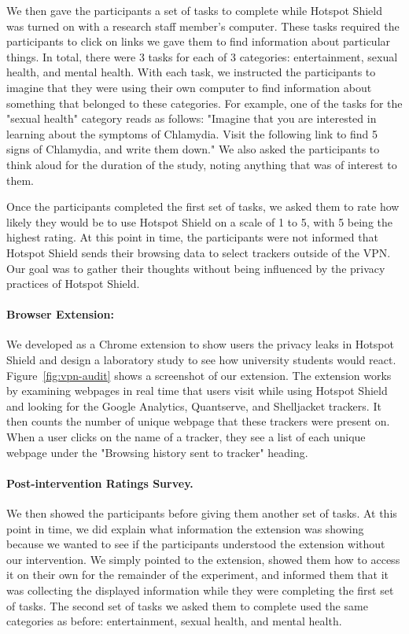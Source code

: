 We then gave the participants a set of tasks to complete while Hotspot Shield
was turned on with a research staff member's computer.  These tasks required
the participants to click on links we gave them to find information about
particular things.  In total, there were 3 tasks for each of 3 categories:
entertainment, sexual health, and mental health.  With each task, we
instructed the participants to imagine that they were using their own computer
to find information about something that belonged to these categories.  For
example, one of the tasks for the "sexual health" category reads as follows:
"Imagine that you are interested in learning about the symptoms of Chlamydia.
Visit the following link to find 5 signs of Chlamydia, and write them down."
We also asked the participants to think aloud for the duration of the study,
noting anything that was of interest to them.  

Once the participants completed the first set of tasks, we asked them to rate
how likely they would be to use Hotspot Shield on a scale of 1 to 5, with 5
being the highest rating.  At this point in time, the participants were not
informed that Hotspot Shield sends their browsing data to select trackers
outside of the VPN.  Our goal was to gather their thoughts without being
influenced by the privacy practices of Hotspot Shield.

\paragraph{Browser Extension: \tool}
We developed \tool as a Chrome extension to show users the privacy leaks
in Hotspot Shield and design a laboratory study to see how university students
would react.  Figure~\ref{fig:vpn-audit} shows a screenshot of our extension.
The extension works by examining webpages in real time that users visit while
using Hotspot Shield and looking for the Google Analytics, Quantserve, and
Shelljacket trackers.  It then counts the number of unique webpage that these
trackers were present on.  When a user clicks on the name of a tracker, they
see a list of each unique webpage under the "Browsing history sent to tracker"
heading. 


\paragraph{Post-intervention Ratings Survey.}
We then showed the participants \tool before giving them another set of tasks.
At this point in time, we did explain what information the extension was showing because we wanted to see if the participants understood the extension without our intervention.
We simply pointed to the extension, showed them how to access it on their own for the remainder of the experiment, and informed them that it was collecting the displayed information while they were completing the first set of tasks.
The second set of tasks we asked them to complete used the same categories as before: entertainment, sexual health, and mental health.

